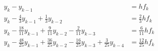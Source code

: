 \begin{align*}
  y_k-y_{k-1} &= h f_k \\
  y_k-\tfrac43 y_{k-1} + \tfrac13y_{k-2} &= \tfrac23 h f_k \\
  y_k-\tfrac{18}{11} y_{k-1} + \tfrac{9}{11} y_{k-2} -
  \tfrac{2}{11} y_{k-3}
              &= \tfrac6{11} h f_k \\
  y_k-\tfrac{48}{25} y_{k-1} + \tfrac{36}{25} y_{k-2} -
  \tfrac{16}{25} y_{k-3} + \tfrac{3}{25} y_{k-4}
              &= \tfrac{12}{25} h f_k
\end{align*}

